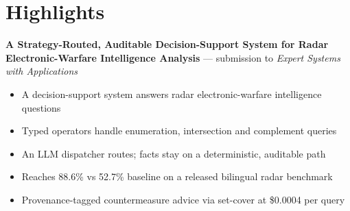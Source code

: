 \documentclass{article}
\begin{document}
\section*{Highlights}
\textbf{A Strategy-Routed, Auditable Decision-Support System for Radar Electronic-Warfare Intelligence Analysis} --- submission to \emph{Expert Systems with Applications}\\[4pt]
\begin{itemize}[leftmargin=1.2em,nosep]
\item A decision-support system answers radar electronic-warfare intelligence questions
\item Typed operators handle enumeration, intersection and complement queries
\item An LLM dispatcher routes; facts stay on a deterministic, auditable path
\item Reaches 88.6\% vs 52.7\% baseline on a released bilingual radar benchmark
\item Provenance-tagged countermeasure advice via set-cover at \$0.0004 per query
\end{itemize}
\end{document}
